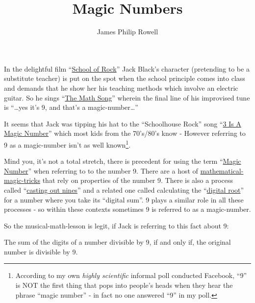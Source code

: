 \documentclass{article}
\title{Magic Numbers}
\author{James Philip Rowell}
\begin{document}
\maketitle

In the delightful film ``\href{https://en.wikipedia.org/wiki/School_of_Rock}{School
of Rock}'' Jack Black's character
(pretending to be a substitute teacher) is put on the spot when
the school principle comes into class and demands that he show
her his teaching methods which involve an electric guitar.
So he sings ``\href{https://www.youtube.com/watch?v=aa8U0nL-KXg}{The
Math Song}'' wherein the final line of his
improvised tune is ``\dots{}yes it's 9, and that's a magic-number\dots{}''

It seems that Jack was tipping his hat
to the ``Schoolhouse Rock'' song ``\href{https://youtu.be/aU4pyiB-kq0}{3
Is A Magic Number}''
which most kids from the 70's/80's know -
However referring to 9 as a magic-number isn't
as well known\footnote{According to my own \emph{highly scientific}
informal poll conducted Facebook, %
``9'' is NOT the first thing that pops into people's heads when they
hear the phrase ``magic number'' - in fact no one answered ``9'' in my poll.}.

Mind you, it's not a total stretch, there is precedent
for using the term ``\href{http://mathworld.wolfram.com/MagicNumber.html}{Magic
Number}'' when referring to to the number 9.
There are a host of
\href{http://mathematics-in-europe.eu/?p=144}{mathematical-magic-tricks}
that rely on properties of the number 9.
There is also a process called
``\href{https://en.wikipedia.org/wiki/Casting_out_nines}{casting out nines}'' and a related one 
called calculating the
``\href{http://mathworld.wolfram.com/DigitalRoot.html}{digital root}''
for a number where you take its ``digital sum''. 9
plays a similar role in all these processes - so within these contexts sometimes 9
is referred to as a magic-number.

So the musical-math-lesson is legit, if Jack is referring to this fact about 9:
\begin{center}
The sum of the digits of a number divisible by 9,
\break
if and only if,
\break
the original number
is divisible by 9.
\end{center}
\end{document}
